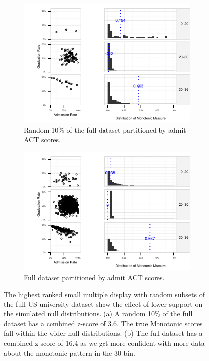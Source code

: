 \begin{figure}[t]
 \centering 
 	 \begin{subfigure}{3.5in}
 \centering 
		\includegraphics[width=3.5in]{images/5_19270496436661-ACT_Composite_75th_percentile_score_bin.pdf}
		  \caption{Random 10\% of the full dataset partitioned by admit ACT scores.}
		 \label{fig:support1}
 	\end{subfigure}
 	 \begin{subfigure}{3.5in}
 \centering 
        \vspace{0.25cm}
		\includegraphics[width=3.5in]{images/15_711260094719-ACT_Composite_75th_percentile_score_bin.pdf}
		  \caption{Full dataset partitioned by admit ACT scores.}
		 \label{fig:support2}
 	\end{subfigure}
	\caption{The highest ranked small multiple display with random subsets of the full US university dataset show the effect of lower support on the simulated null distributions. (a) A random 10\% of the full dataset has a combined z-score of 3.6. The true Monotonic scores fall within the wider null distributions. (b) The full dataset has a combined z-score of 16.4 as we get more confident with more data about the monotonic pattern in the $30$ bin.}
\end{figure}


